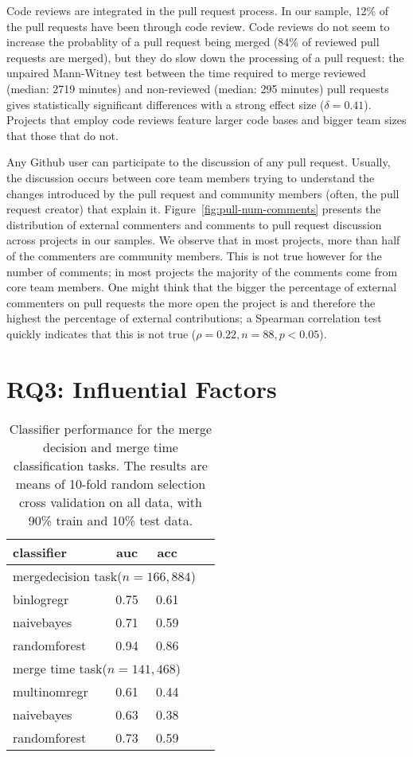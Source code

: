 \documentclass{sig-alternate}
\begin{document}
Code reviews are integrated in the pull request process. In our sample, 12\% of
the pull requests have been through code review. Code reviews do not seem to
increase the probablity of a pull request being merged (84\% of reviewed pull
requests are merged), but they do slow down the processing of a pull request:
the unpaired Mann-Witney test between the time required to merge reviewed
(median: 2719 minutes) and non-reviewed (median: 295 minutes) pull requests
gives statistically significant differences with a strong effect size ($\delta =
0.41$). Projects that employ code reviews feature larger code bases and 
bigger team sizes that those that do not.

Any Github user can participate to the discussion of any pull request. Usually,
the discussion occurs between core team members trying to understand the changes
introduced by the pull request and community members (often, the pull
request creator) that explain it. Figure~\ref{fig:pull-num-comments} presents
the distribution of external commenters and comments to pull request discussion
across projects in our samples. We observe that in most projects, more than half
of the commenters are community members. This is not true however for the number
of comments; in most projects the majority of the comments come from core team
members. One might think that the bigger the percentage of external commenters
on pull requests the more open the project is and therefore the highest the
percentage of external contributions; a Spearman correlation test quickly
indicates that this is not true ($\rho = 0.22, n = 88, p < 0.05$).

\section{RQ3: Influential Factors}
\label{sec:accrej}

\begin{table}
  \centering
  \begin{tabular}{lcccc}
    \hline
    {\bf classifier} & {\sc auc} & {\sc acc} \\
    \hline
    \multicolumn{4}{l}{\textsf{mergedecision} task($n = 166,884$)} \\
    binlogregr    & 0.75 & 0.61  \\
    naivebayes    & 0.71 & 0.59  \\
    randomforest  & 0.94 & 0.86  \\
    \hline
    \multicolumn{4}{l}{\textsf{merge time} task($n = 141,468$)} \\
    multinomregr  & 0.61 & 0.44  \\
    naivebayes    & 0.63 & 0.38  \\
    randomforest  & 0.73 & 0.59  \\
    \hline
  \end{tabular}
  \caption{Classifier performance for the merge decision and merge time
  classification tasks. The results are means of 10-fold random selection
  cross validation on all data, with 90\% train and 10\% test data.}
  \label{tab:classif-perf}
\end{table}
\end{document}
